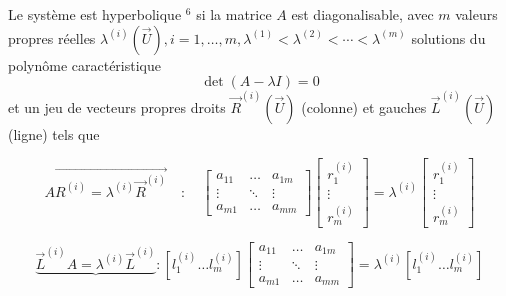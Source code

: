 Le système est hyperbolique $^{6}$ si la matrice $A$ est diagonalisable, avec $m$ valeurs propres réelles $\lambda^{(i)}(\vec{U}), i=1, \ldots, m, \lambda^{(1)}<\lambda^{(2)}<\cdots<\lambda^{(m)}$ solutions du polynôme caractéristique
$$
\operatorname{det}(A-\lambda I)=0
$$
et un jeu de vecteurs propres droits $\vec{R}^{(i)}(\vec{U})$ (colonne) et gauches $\vec{L}^{(i)}(\vec{U})$ (ligne) tels que

\begin{equation}
A \overrightarrow{R^{(i)}=\lambda^{(i)} \vec{R}^{(i)}} \quad: \quad\left[\begin{array}{ccc}
a_{11} & \ldots & a_{1 m} \\
\vdots & \ddots & \vdots \\
a_{m 1} & \ldots & a_{m m}
\end{array}\right]\left[\begin{array}{c}
r_{1}^{(i)} \\
\vdots \\
r_{m}^{(i)}
\end{array}\right]=\lambda^{(i)}\left[\begin{array}{c}
r_{1}^{(i)} \\
\vdots \\
r_{m}^{(i)}
\end{array}\right]
\end{equation}

\begin{equation}
\underbrace{\vec{L}^{(i)} A=\lambda^{(i)} \vec{L}^{(i)}}:\left[l_{1}^{(i)} \ldots l_{m}^{(i)}\right]\left[\begin{array}{ccc}
a_{11} & \ldots & a_{1 m} \\
\vdots & \ddots & \vdots \\
a_{m 1} & \ldots & a_{m m}
\end{array}\right]=\lambda^{(i)}\left[l_{1}^{(i)} \ldots l_{m}^{(i)}\right]
\end{equation}


